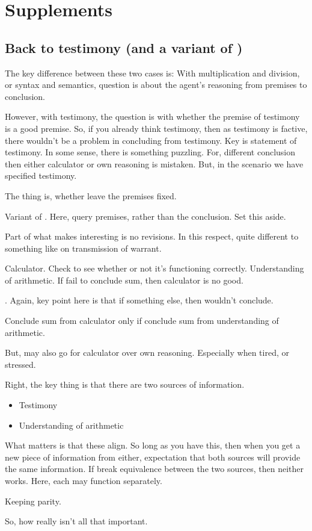 \section{Supplements}
\label{sec:overview:supplements}

\subsection{Back to testimony (and a variant of \zS{})}

\begin{note}
  The key difference between these two cases is:
  With multiplication and division, or syntax and semantics, question is about the agent's reasoning from premises to conclusion.

  However, with testimony, the question is with whether the premise of testimony is a good premise.
  So, if you already think testimony, then as testimony is factive, there wouldn't be a problem in concluding from testimony.
  Key is statement of testimony.
  In some sense, there is something puzzling.
  For, different conclusion then either calculator or own reasoning is mistaken.
  But, in the scenario we have specified testimony.

  The thing is, whether leave the premises fixed.

  Variant of \zS{}.
  Here, query premises, rather than the conclusion.
  Set this aside.

  Part of what makes \zS{} interesting is no revisions.
  In this respect, quite different to something like \citeauthor{Wright:2011wn} on transmission of warrant.
\end{note}

\begin{note}
  Calculator.
  Check to see whether or not it's functioning correctly.
  Understanding of arithmetic.
  If fail to conclude sum, then calculator is no good.

  \zS{}.
  Again, key point here is that if something else, then wouldn't conclude.

  Conclude sum from calculator only if conclude sum from understanding of arithmetic.

  But, may also go for calculator over own reasoning.
  Especially when tired, or stressed.
\end{note}

\begin{note}
  {
    Right, the key thing is that there are two sources of information.
    \begin{itemize}
    \item
      Testimony
    \item
      Understanding of arithmetic
    \end{itemize}
    What matters is that these align.
    So long as you have this, then when you get a new piece of information from either, expectation that both sources will provide the same information.
    If break equivalence between the two sources, then neither works.
    Here, each may function separately.

    Keeping parity.

    So, how really isn't all that important.
  }
\end{note}

